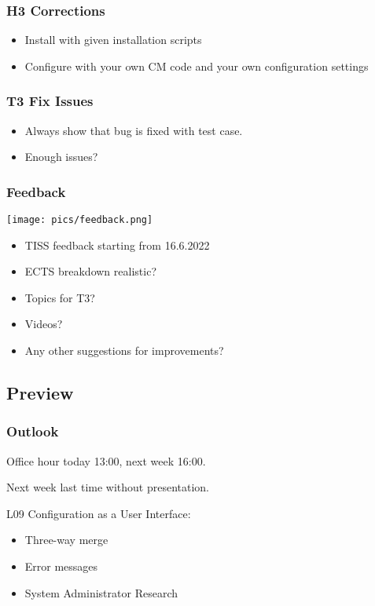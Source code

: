 \begin{assignment}
	\frametitle{H3 Corrections}

	\begin{itemize}
	\item Install with given installation scripts
	\item Configure with your own CM code and your own configuration settings
	\end{itemize}
\end{assignment}

\begin{assignment}
	\frametitle{T3 Fix Issues}

	\begin{itemize}
	\item Always show that bug is fixed with test case.
	\item Enough issues?
	\end{itemize}
\end{assignment}

\breakframe

\begin{assignment}
	\frametitle{Feedback}
	\hfill \texttt{[image: pics/feedback.png]}
	\vspace{-1cm}
	\begin{itemize}
		\item TISS feedback starting from 16.6.2022
		\item ECTS breakdown realistic?
		\item Topics for T3?
		\item Videos?
		\item Any other suggestions for improvements?
	\end{itemize}
\end{assignment}

\subsection{Preview}

\begin{frame}
	\frametitle{Outlook}
	Office hour today 13:00, next week 16:00.

	Next week last time without presentation.

	L09 Configuration as a User Interface:
	\begin{itemize}
		\item Three-way merge
		\item Error messages
		\item System Administrator Research
	\end{itemize}
\end{frame}




\appendix

\begin{frame}[allowframebreaks]
	
	
\end{frame}




